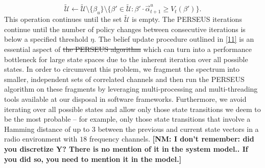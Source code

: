 \documentclass[10pt,twocolumn]{IEEEtran}
\newcommand{\sst}[1]{\st{#1}}
\newcommand{\nm}[1]{{\color{blue}\bf{[NM: #1]}}}
\newcommand{\add}[1]{{\color{red}{#1}}}
\begin{document}
$$
\tilde{\mathcal{U}}\leftarrow \tilde{\mathcal{U}}\setminus\{\beta_u\}\setminus
\{\beta'\in\tilde{\mathcal{U}}:\beta'{\cdot}\vec{\alpha}_{t+1}^{u}\geq V_t(\beta')\}.
$$
This operation continues until the set $\tilde{\mathcal{U}}$ is empty. The PERSEUS iterations continue until the number of policy changes between consecutive iterations is below a specified threshold $\eta$. The belief update procedure outlined in \eqref{11} is an essential aspect of\sst{ the PERSEUS algorithm} \add{POMDPs,} which can turn into a performance bottleneck for large state spaces due to the inherent iteration over all possible states. In order to circumvent this problem, we fragment the spectrum into smaller, independent sets of correlated channels and then run the PERSEUS algorithm on these fragments by leveraging multi-processing and multi-threading tools available at our disposal in software frameworks. Furthermore, we avoid iterating over all possible states and allow only those state transitions we deem to be the most probable -- for example, only those state transitions that involve a Hamming distance of up to $3$ between the previous and current state vectors in a radio environment with $18$ frequency channels.
\nm{I don't remember: did you discretize Y? There is no mention of it in the system model.. 
If you did so, you need to mention it in the model.}
\vspace{-3.5mm}
\end{document}
